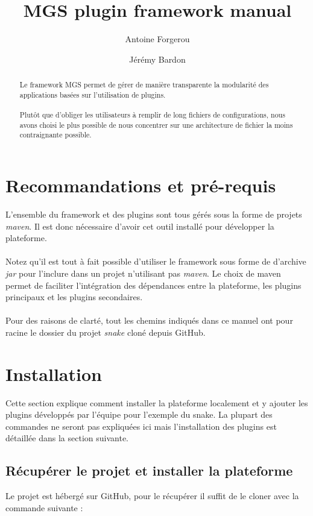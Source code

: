 \documentclass[12pt,a4paper]{article}
\title{MGS plugin framework manual}
\author{Antoine Forgerou \and Jérémy Bardon}
\date{}
\begin{document}
	\renewcommand{\contentsname}{Sommaire}
	\renewcommand{\arraystretch}{1.8}
	\maketitle	
	
	\vspace{0.80cm}
	\tableofcontents	

	\thispagestyle{empty}	
	\setcounter{page}{0}
	\newpage
	
\begin{abstract}
Le framework MGS permet de gérer de manière transparente la modularité des 
applications basées sur l'utilisation de plugins. 
\\\\
Plutôt que d'obliger les utilisateurs à remplir de long fichiers de configurations, 
nous avons choisi le plus possible de nous concentrer sur une architecture de 
fichier la moins contraignante possible.
\end{abstract}

\section{Recommandations et pré-requis}
L'ensemble du framework et des plugins sont tous gérés sous la forme de projets 
\emph{maven}. Il est donc nécessaire d'avoir cet outil installé pour développer 
la plateforme.
\\\\
Notez qu'il est tout à fait possible d'utiliser le framework sous forme de d'archive 
\emph{jar} pour l'inclure dans un projet n'utilisant pas \emph{maven}. Le choix de 
maven permet de faciliter l'intégration des dépendances entre la plateforme, les 
plugins principaux et les plugins secondaires.
\\\\
Pour des raisons de clarté, tout les chemins indiqués dans ce manuel ont pour racine 
le dossier du projet \emph{snake} cloné depuis GitHub.

\section{Installation}
Cette section explique comment installer la plateforme localement et y ajouter 
les plugins développés par l'équipe pour l'exemple du snake. La plupart des commandes 
ne seront pas expliquées ici mais l'installation des plugins est détaillée dans la 
section suivante.

\subsection{Récupérer le projet et installer la plateforme}
Le projet est hébergé sur GitHub, pour le récupérer il suffit de le cloner avec
la commande suivante :
\end{document}
